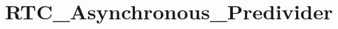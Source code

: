 \hypertarget{group___r_t_c___asynchronous___predivider}{\section{R\-T\-C\-\_\-\-Asynchronous\-\_\-\-Predivider}
\label{group___r_t_c___asynchronous___predivider}
}
